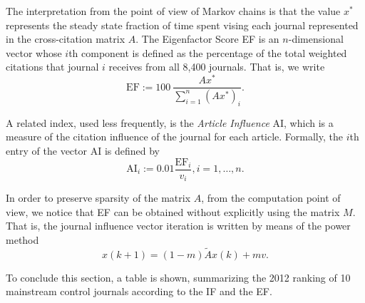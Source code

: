 \documentclass[11pt,draftcls,onecolumn]{IEEEtran}
\begin{document}
The interpretation from the point of view of Markov chains is that the value
$x^*$ represents the steady state fraction of time spent vising each journal 
represented in the cross-citation matrix $A$. The Eigenfactor %
Score EF is an $n$-dimensional vector whose $i$th 
component is defined as the percentage of the total weighted citations that journal $i$ receives 
from all 8,400 journals. That is, we write
$$
\mbox{EF} := 100 \ \frac{A x^*}{\sum_{i=1}^n (A x^*)_i}.
$$

A related index, used less frequently, is the {\it Article Influence} AI, 
which is a measure of the citation influence 
of the journal for each article. Formally, 
the $i$th entry of the vector AI is defined by
$$
\mbox{AI}_i := 0.01 \frac{\mbox{EF}_i}{v_i}, i=1,\ldots,n.
$$

In order to preserve sparsity of the matrix $A$, from the computation point of view, we notice that 
EF can be obtained without explicitly using the matrix $M$. 
That is, the journal influence 
vector iteration is written by means of the power method 
\begin{equation*}
x(k+1) = (1-m) \tilde A x(k) + m v.
\end{equation*}

To conclude this section, a table is shown, summarizing 
the 2012 ranking of 10 mainstream control journals according to the IF and the EF.
\end{document}
